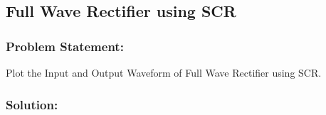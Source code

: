 

\pagebreak

\subsection{Full Wave Rectifier using SCR}

\subsubsection{Problem Statement:}  Plot the Input and Output Waveform of Full Wave Rectifier using SCR.

\subsubsection{Solution:}

